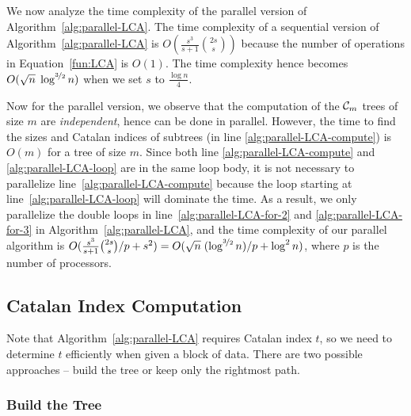 We now analyze the time complexity of the parallel version of
Algorithm~\ref{alg:parallel-LCA}.  The time complexity of a sequential
version of Algorithm~\ref{alg:parallel-LCA} is $O(\frac{s^3}{s+1}
\binom{2s}{s})$ because the number of operations in
Equation~\ref{fun:LCA} is $O(1)$.  The time complexity hence becomes
$O(\sqrt{n} \; \log^{\nicefrac{3}{2}} n)$ when we set $s$ to $\frac{\log
n}{4}$.

Now for the parallel version, we observe that the computation of the
${\cal C}_m$ trees of size $m$ are {\em independent}, hence can be done
in parallel.  However, the time to find the sizes and Catalan indices of
subtrees (in line \ref{alg:parallel-LCA-compute}) is $O(m)$ for a tree
of size $m$.  Since both line \ref{alg:parallel-LCA-compute} and
\ref{alg:parallel-LCA-loop} are in the same loop body, it is not
necessary to parallelize line~\ref{alg:parallel-LCA-compute} because the
loop starting at line~\ref{alg:parallel-LCA-loop} will dominate the
time.  As a result, we only parallelize the double loops in
line~\ref{alg:parallel-LCA-for-2} and \ref{alg:parallel-LCA-for-3} in
Algorithm~\ref{alg:parallel-LCA}, and the time complexity of our
parallel algorithm is $O(\frac{s^3}{s+1} \binom{2s}{s} / p + s^2) =
O(\sqrt{n} \; (\log^{\nicefrac{3}{2}} n) / p + \log^2 n )$, where $p$ is
the number of processors.



\subsection{Catalan Index Computation}

Note that Algorithm~\ref{alg:parallel-LCA} requires Catalan index $t$,
so we need to determine $t$ efficiently when given a block of data.
There are two possible approaches -- build the tree or keep only the
rightmost path.


\subsubsection{Build the Tree}


